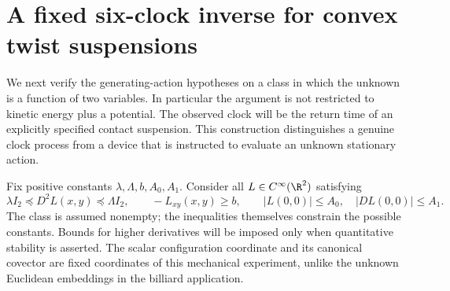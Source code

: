 \section{A fixed six-clock inverse for convex twist suspensions}
\label{sec:v79-suspensions}

We next verify the generating-action hypotheses on a class in which the
unknown is a function of two variables.  In particular the argument is
not restricted to kinetic energy plus a potential.  The observed clock
will be the return time of an explicitly specified contact suspension.
This construction distinguishes a genuine clock process from a device
that is instructed to evaluate an unknown stationary action.

Fix positive constants $\lambda,\Lambda,b,A_0,A_1$.  Consider all
$L\in C^\infty(\R^2)$ satisfying
\begin{equation}\label{eq:v79-convex-class}
 \lambda I_2\preceq D^2L(x,y)\preceq\Lambda I_2,
 \qquad -L_{xy}(x,y)\ge b,
 \qquad |L(0,0)|\le A_0,\quad |DL(0,0)|\le A_1.
\end{equation}
The class is assumed nonempty; the inequalities themselves constrain
the possible constants.  Bounds for higher derivatives will be imposed
only when quantitative stability is asserted.  The scalar configuration
coordinate and its canonical covector are fixed coordinates of this
mechanical experiment, unlike the unknown Euclidean embeddings in the
billiard application.

